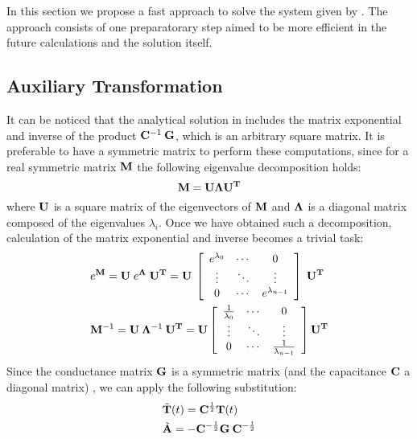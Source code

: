In this section we propose a fast approach to solve the system given by . The approach consists of one preparatorary step aimed to be more efficient in the future calculations and the solution itself.

\subsection{Auxiliary Transformation}
It can be noticed that the analytical solution in  includes the matrix exponential and inverse of the product $\mathbf{\mathbf{C}}^{-1} \: \mathbf{\mathbf{G}}$, which is an arbitrary square matrix. It is preferable to have a symmetric matrix to perform these computations, since for a real symmetric matrix $\mathbf{M}$ the following eigenvalue decomposition holds:
\begin{equation} \label{eq:eigenvalue-decomposition}
  \mathbf{M} = \mathbf{\mathbf{U}} \mathbf{\Lambda} \mathbf{\mathbf{U}}^{\mathbf{T}}
\end{equation}
where $\mathbf{\mathbf{U}}$ is a square matrix of the eigenvectors of $\mathbf{M}$ and $\mathbf{\Lambda}$ is a diagonal matrix composed of the eigenvalues $\lambda_i$. Once we have obtained such a decomposition, calculation of the matrix exponential and inverse becomes a trivial task:
\begin{align*}
  & e^{\mathbf{M}} = \mathbf{\mathbf{U}} \; e^{\mathbf{\Lambda}} \; \mathbf{\mathbf{U}}^{\mathbf{T}} = \mathbf{\mathbf{U}}\: \left[
      \begin{array}{ccc}
        e^{\lambda_0} & \cdots & 0 \\
        \vdots & \ddots & \vdots \\
        0 & \cdots & e^{\lambda_{n - 1}}
      \end{array}
    \right] \; \mathbf{\mathbf{U}}^{\mathbf{T}} \\
  & \mathbf{M}^{-1} = \mathbf{\mathbf{U}} \: \mathbf{\Lambda}^{-1} \: \mathbf{\mathbf{U}}^{\mathbf{T}} = \mathbf{\mathbf{U}} \left[
      \begin{array}{ccc}
        \frac{1}{\lambda_0} & \cdots & 0 \\
        \vdots & \ddots & \vdots \\
        0 & \cdots & \frac{1}{\lambda_{n - 1}}
      \end{array}
    \right] \mathbf{\mathbf{U}}^{\mathbf{T}} \\
\end{align*}
Since the conductance matrix $\mathbf{\mathbf{G}}$ is a symmetric matrix (and the capacitance $\mathbf{\mathbf{C}}$ a diagonal matrix) \cite{rao2007}, we can apply the following substitution:
\begin{align*}
  & \tilde{\mathbf{T}}(t) = \mathbf{C}^{\frac{1}{2}} \mathbf{T}(t) \\
  & \tilde{\mathbf{A}} = -\mathbf{C}^{-\frac{1}{2}} \mathbf{G} \: \mathbf{C}^{-\frac{1}{2}}
\end{align*}
